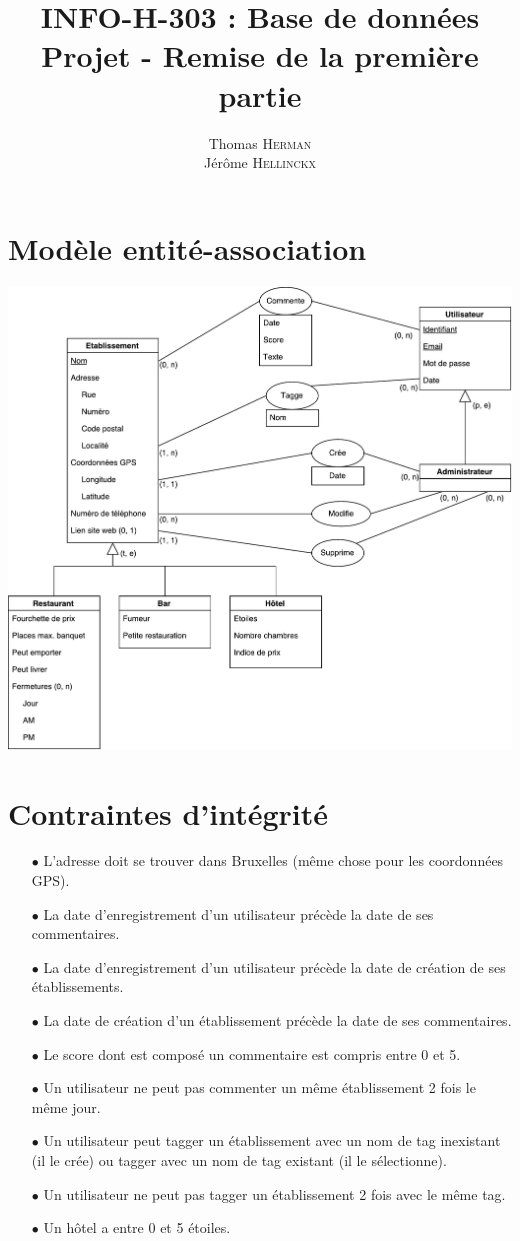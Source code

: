 \documentclass[a4paper, 11pt]{article}
\title{{INFO-H-303 : Base de données} \\ Projet - Remise de la première partie}
\author{Thomas \textsc{Herman} \\ Jérôme \textsc{Hellinckx}}
\begin{document}
\maketitle

\section*{Modèle entité-association}
\begin{center}
	\includegraphics[scale=0.6]{horecaEA}
\end{center}

\section*{Contraintes d'intégrité}

\begin{itemize}
	\item[$\bullet$] L'adresse doit se trouver dans Bruxelles (même chose pour les coordonnées GPS).
	\item[$\bullet$] La date d'enregistrement d'un utilisateur précède la date de ses commentaires. 
	\item[$\bullet$] La date d'enregistrement d'un utilisateur précède la date de création de ses établissements.
	\item[$\bullet$] La date de création d'un établissement précède la date de ses commentaires.
	\item[$\bullet$] Le score dont est composé un commentaire est compris entre 0 et 5.
	\item[$\bullet$] Un utilisateur ne peut pas commenter un même établissement 2 fois le même jour.
	\item[$\bullet$] Un utilisateur peut tagger un établissement avec un nom de tag inexistant (il le crée) ou tagger avec un nom de tag existant (il le sélectionne). 
	\item[$\bullet$] Un utilisateur ne peut pas tagger un établissement 2 fois avec le même tag.
	\item[$\bullet$] Un hôtel a entre 0 et 5 étoiles.
\end{itemize}
\end{document}
